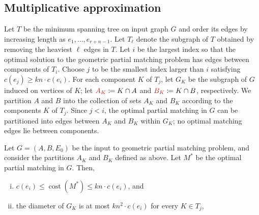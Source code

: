 \documentclass[a4paper,UKenglish]{socg-lipics-v2018}
\makeatletter
\def\note#1{\textcolor{red}{{#1}}}
\def\polylog{\mathop{\mathrm{polylog}}}
\def\eps{\varepsilon}
\def\cost{\operatorname{cost}}
\theoremstyle{plain}
\numberwithin{figure}{section}
\def\EMPH#1{\textcolor{BrickRed}{{\emph{#1}}}}
\def\n@te#1{\textsf{\boldmath \textbf{$\langle\!\langle$#1$\rangle\!\rangle$}}\leavevmode}
\def\note#1{\textcolor{red}{\n@te{#1}}}
\makeatother
\begin{document}


\begin{toappendix}
\subsection{Multiplicative approximation}
\label{SSA:multiplicative-approx}

Let $T$ be the minimum spanning tree on input graph $G$ and order
its edges by increasing length as $e_1, \ldots, e_{r+n-1}$.
Let $T_\ell$ denote the subgraph of $T$ obtained by removing the heaviest $\ell$ edges in $T$.
%
Let $i$ be the largest index so that
the optimal solution to the geometric partial matching problem has edges between components of $T_i$.
Choose $j$ to be the smallest index larger than $i$ satisfying
$c(e_j) \geq kn \cdot c(e_i)$.
For each component $K$ of $T_j$, let
$G_K$ be the subgraph of $G$ induced on vertices of $K$;
let $\EMPH{$A_K$} \coloneqq K \cap A$ and $\EMPH{$B_K$} \coloneqq K \cap B$, respectively.
We partition $A$ and $B$ into the collection of sets $A_K$ and $B_K$ according to the components $K$ of $T_j$.
Since $j < i$, the optimal partial matching in $G$ can be partitioned into edges between $A_K$ and $B_K$ within $G_K$; no optimal matching edges lie between components.

\begin{lemma}
\label{lemma:sa_partition}
%
Let $G = (A,B,E_0)$ be the input to geometric partial matching problem, and consider the partitions $A_K$ and $B_K$ defined as above.
Let $M^*$ be the optimal partial matching in $G$.
Then,
\begin{enumerate}[(i)]
\item $c(e_i) \leq \cost(M^*) \le kn \cdot c(e_i)$, and
\item the diameter of $G_K$ is at most $kn^2 \cdot c(e_i)$ for every $K \in T_j$,
\end{enumerate}
\end{lemma}


\end{toappendix}
\end{document}
